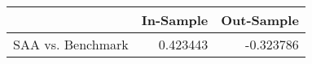 \begin{tabular}{lrr}
\toprule
{} &  In-Sample &  Out-Sample \\
\midrule
SAA vs. Benchmark &   0.423443 &   -0.323786 \\
\bottomrule
\end{tabular}
